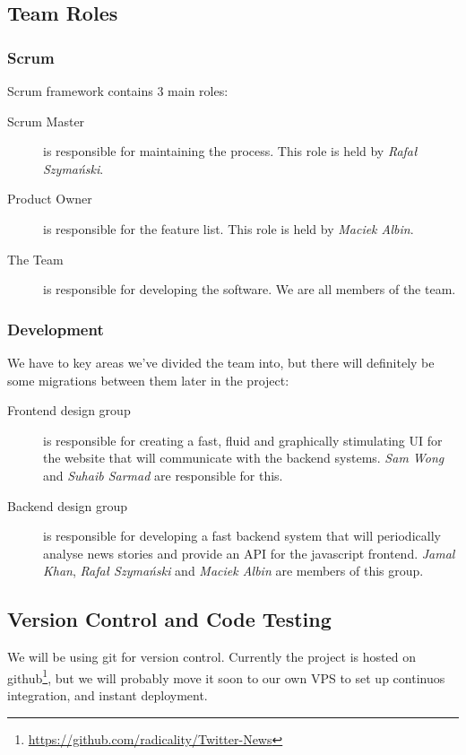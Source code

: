 \documentclass[a4paper,11pt]{article}
\begin{document}
		\subsection{Team Roles}
		  \subsubsection{Scrum}
		    Scrum framework contains 3 main roles:
		    \begin{description}
		      \item[Scrum Master] is responsible for maintaining the process. This role is held by \emph{Rafał Szymański}.
		      \item[Product Owner] is responsible for the feature list. This role is held by \emph{Maciek Albin}.
		      \item[The Team] is responsible for developing the software. We are all members of the team.
		    \end{description} 
		    
		  \subsubsection{Development}
		    We have to key areas we've divided the team into, but there will definitely be some migrations between them later in the project:
		    \begin{description}
		      \item[Frontend design group] is responsible for creating a fast, fluid and graphically stimulating UI for the website that will communicate with the backend systems. \emph{Sam Wong} and \emph{Suhaib Sarmad} are responsible for this.
		      \item[Backend design group] is responsible for developing a fast backend system that will periodically analyse news stories and provide an API for the javascript frontend. \emph{Jamal Khan}, \emph{Rafał Szymański} and \emph{Maciek Albin} are members of this group.
		    \end{description}
	
		\subsection{Version Control and Code Testing}
		
			We will be using git for version control. Currently the project is hosted on github\footnote{\url{https://github.com/radicality/Twitter-News}}, but we will probably move it soon to our own VPS to set up continuos integration, and instant deployment.
			
\end{document}
